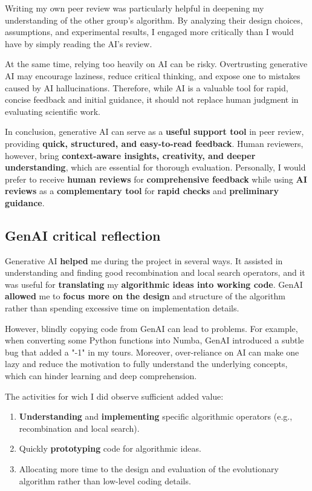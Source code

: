 \documentclass[a4paper,10pt]{article} %
\begin{document}
\noindent
Writing my own peer review was particularly helpful in deepening my understanding of the other group's algorithm. By analyzing their design choices, assumptions, and experimental results, I engaged more critically than I would have by simply reading the AI's review.

\noindent
At the same time, relying too heavily on AI can be risky. Overtrusting generative AI may encourage laziness, reduce critical thinking, and expose one to mistakes caused by AI hallucinations. Therefore, while AI is a valuable tool for rapid, concise feedback and initial guidance, it should not replace human judgment in evaluating scientific work.

\noindent
In conclusion, generative AI can serve as a \textbf{useful support tool} in peer review, providing \textbf{quick, structured, and easy-to-read feedback}. Human reviewers, however, bring \textbf{context-aware insights, creativity, and deeper understanding}, which are essential for thorough evaluation. Personally, I would prefer to receive \textbf{human reviews} for \textbf{comprehensive feedback} while using \textbf{AI reviews} as a \textbf{complementary tool} for \textbf{rapid checks} and \textbf{preliminary guidance}.

\subsection{GenAI critical reflection}
\noindent
Generative AI \textbf{helped} me during the project in several ways. It assisted in understanding and finding good recombination and local search operators, and it was useful for \textbf{translating} my \textbf{algorithmic ideas into working code}. GenAI \textbf{allowed} me to \textbf{focus more on the design} and structure of the algorithm rather than spending excessive time on implementation details. 

\noindent
However, blindly copying code from GenAI can lead to problems. For example, when converting some Python functions into Numba, GenAI introduced a subtle bug that added a "-1" in my tours. Moreover, over-reliance on AI can make one lazy and reduce the motivation to fully understand the underlying concepts, which can hinder learning and deep comprehension.

\noindent
The activities for wich I did observe sufficient added value:
\begin{enumerate}
 \item \textbf{Understanding} and \textbf{implementing} specific algorithmic operators (e.g., recombination and local search).  
 \item Quickly \textbf{prototyping} code for algorithmic ideas.  
 \item Allocating more time to the design and evaluation of the evolutionary algorithm rather than low-level coding details.
\end{enumerate}
\end{document}
